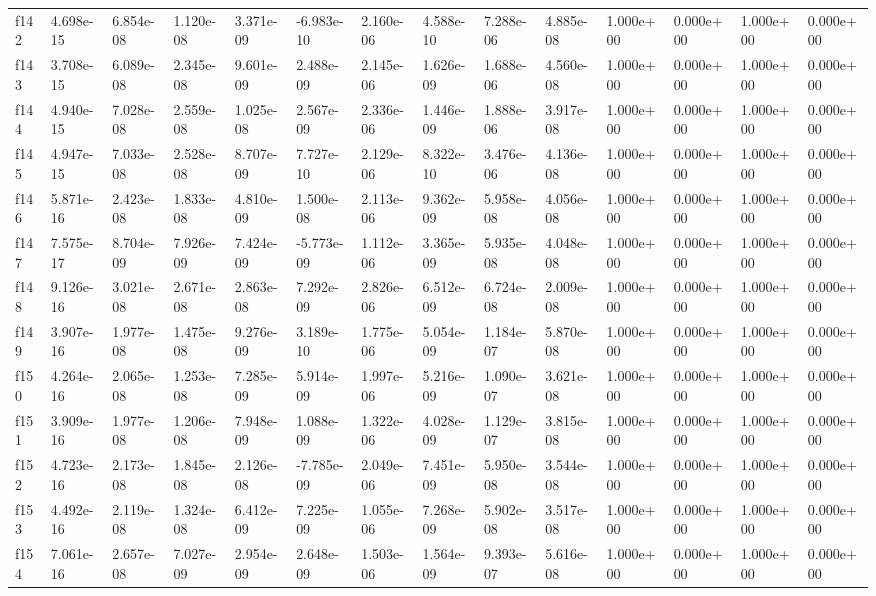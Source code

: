 \begin{table}
\begin{tabular}{llllllllllllll}
f142 & 4.698e-15 & 6.854e-08 & 1.120e-08 & 3.371e-09 & -6.983e-10 & 2.160e-06 & 4.588e-10 & 7.288e-06 & 4.885e-08 & 1.000e+00 & 0.000e+00 & 1.000e+00 & 0.000e+00 \\
f143 & 3.708e-15 & 6.089e-08 & 2.345e-08 & 9.601e-09 & 2.488e-09 & 2.145e-06 & 1.626e-09 & 1.688e-06 & 4.560e-08 & 1.000e+00 & 0.000e+00 & 1.000e+00 & 0.000e+00 \\
f144 & 4.940e-15 & 7.028e-08 & 2.559e-08 & 1.025e-08 & 2.567e-09 & 2.336e-06 & 1.446e-09 & 1.888e-06 & 3.917e-08 & 1.000e+00 & 0.000e+00 & 1.000e+00 & 0.000e+00 \\
f145 & 4.947e-15 & 7.033e-08 & 2.528e-08 & 8.707e-09 & 7.727e-10 & 2.129e-06 & 8.322e-10 & 3.476e-06 & 4.136e-08 & 1.000e+00 & 0.000e+00 & 1.000e+00 & 0.000e+00 \\
f146 & 5.871e-16 & 2.423e-08 & 1.833e-08 & 4.810e-09 & 1.500e-08 & 2.113e-06 & 9.362e-09 & 5.958e-08 & 4.056e-08 & 1.000e+00 & 0.000e+00 & 1.000e+00 & 0.000e+00 \\
f147 & 7.575e-17 & 8.704e-09 & 7.926e-09 & 7.424e-09 & -5.773e-09 & 1.112e-06 & 3.365e-09 & 5.935e-08 & 4.048e-08 & 1.000e+00 & 0.000e+00 & 1.000e+00 & 0.000e+00 \\
f148 & 9.126e-16 & 3.021e-08 & 2.671e-08 & 2.863e-08 & 7.292e-09 & 2.826e-06 & 6.512e-09 & 6.724e-08 & 2.009e-08 & 1.000e+00 & 0.000e+00 & 1.000e+00 & 0.000e+00 \\
f149 & 3.907e-16 & 1.977e-08 & 1.475e-08 & 9.276e-09 & 3.189e-10 & 1.775e-06 & 5.054e-09 & 1.184e-07 & 5.870e-08 & 1.000e+00 & 0.000e+00 & 1.000e+00 & 0.000e+00 \\
f150 & 4.264e-16 & 2.065e-08 & 1.253e-08 & 7.285e-09 & 5.914e-09 & 1.997e-06 & 5.216e-09 & 1.090e-07 & 3.621e-08 & 1.000e+00 & 0.000e+00 & 1.000e+00 & 0.000e+00 \\
f151 & 3.909e-16 & 1.977e-08 & 1.206e-08 & 7.948e-09 & 1.088e-09 & 1.322e-06 & 4.028e-09 & 1.129e-07 & 3.815e-08 & 1.000e+00 & 0.000e+00 & 1.000e+00 & 0.000e+00 \\
f152 & 4.723e-16 & 2.173e-08 & 1.845e-08 & 2.126e-08 & -7.785e-09 & 2.049e-06 & 7.451e-09 & 5.950e-08 & 3.544e-08 & 1.000e+00 & 0.000e+00 & 1.000e+00 & 0.000e+00 \\
f153 & 4.492e-16 & 2.119e-08 & 1.324e-08 & 6.412e-09 & 7.225e-09 & 1.055e-06 & 7.268e-09 & 5.902e-08 & 3.517e-08 & 1.000e+00 & 0.000e+00 & 1.000e+00 & 0.000e+00 \\
f154 & 7.061e-16 & 2.657e-08 & 7.027e-09 & 2.954e-09 & 2.648e-09 & 1.503e-06 & 1.564e-09 & 9.393e-07 & 5.616e-08 & 1.000e+00 & 0.000e+00 & 1.000e+00 & 0.000e+00 \\

\end{tabular}
\end{table}
